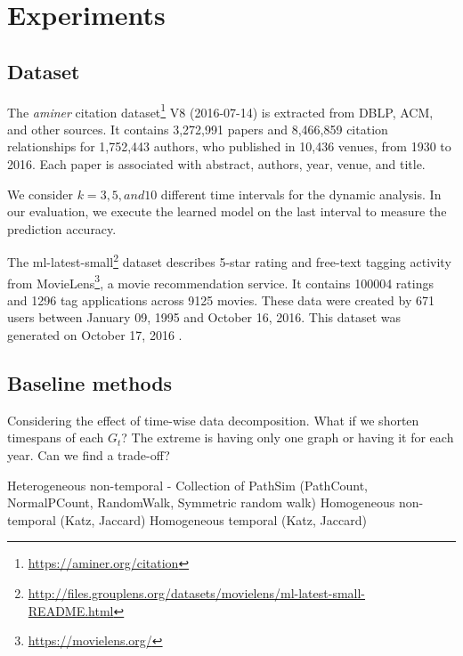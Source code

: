 \section{Experiments}

\subsection{Dataset}



The \textit{aminer} citation dataset\footnote{\url{https://aminer.org/citation}} V8 (2016-07-14) is extracted from DBLP, ACM, and other sources. It contains 3,272,991 papers and 8,466,859 citation relationships for 1,752,443 authors, who published in 10,436 venues, from 1930 to 2016. Each paper is associated with abstract, authors, year, venue, and title. 

We consider $k=3, 5, and 10$ different time intervals for the dynamic analysis. In our evaluation, we execute the learned model on the last interval to measure the prediction accuracy.

The ml-latest-small\footnote{\url{http://files.grouplens.org/datasets/movielens/ml-latest-small-README.html}} dataset describes 5-star rating and free-text tagging activity from MovieLens\footnote{\url{https://movielens.org/}}, a movie recommendation service. It contains 100004 ratings and 1296 tag applications across 9125 movies. These data were created by 671 users between January 09, 1995 and October 16, 2016. This dataset was generated on October 17, 2016 .


\subsection{Baseline methods}

Considering the effect of time-wise data decomposition. What if we shorten timespans of each $G_t$? The extreme is having only one graph or having it for each year. Can we find a trade-off?

Heterogeneous non-temporal - Collection of PathSim (PathCount, NormalPCount, RandomWalk, Symmetric random walk)
Homogeneous non-temporal (Katz, Jaccard)
Homogeneous temporal (Katz, Jaccard)

